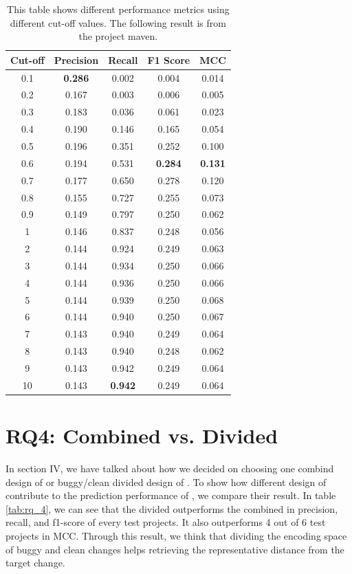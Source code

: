 \begin{table}[!ht]
\centering
\caption{This table shows different performance metrics using different cut-off values.
The following result is from the project maven. }
\begin{tabular}{|c|c|c|c|c|}
\hline
Cut-off & \multicolumn{1}{c|}{Precision} & \multicolumn{1}{c|}{Recall} & \multicolumn{1}{c|}{F1 Score} & \multicolumn{1}{c|}{MCC} \\ \hline
0.1 & \textbf{0.286} & 0.002 & 0.004 & 0.014 \\ \hline
0.2 & 0.167 & 0.003 & 0.006 & 0.005 \\ \hline
0.3 & 0.183 & 0.036 & 0.061 & 0.023 \\ \hline
0.4 & 0.190 & 0.146 & 0.165 & 0.054 \\ \hline
0.5 & 0.196 & 0.351 & 0.252 & 0.100 \\ \hline
0.6 & 0.194 & 0.531 & \textbf{0.284} & \textbf{0.131} \\ \hline
0.7 & 0.177 & 0.650 & 0.278 & 0.120 \\ \hline
0.8 & 0.155 & 0.727 & 0.255 & 0.073 \\ \hline
0.9 & 0.149 & 0.797 & 0.250 & 0.062 \\ \hline
1 & 0.146 & 0.837 & 0.248 & 0.056 \\ \hline
2 & 0.144 & 0.924 & 0.249 & 0.063 \\ \hline
3 & 0.144 & 0.934 & 0.250 & 0.066 \\ \hline
4 & 0.144 & 0.936 & 0.250 & 0.066 \\ \hline
5 & 0.144 & 0.939 & 0.250 & 0.068 \\ \hline
6 & 0.144 & 0.940 & 0.250 & 0.067 \\ \hline
7 & 0.143 & 0.940 & 0.249 & 0.064 \\ \hline
8 & 0.143 & 0.940 & 0.248 & 0.062 \\ \hline
9 & 0.143 & 0.942 & 0.249 & 0.064 \\ \hline
10 & 0.143 & \textbf{0.942} & 0.249 & 0.064 \\ \hline
\end{tabular}%
\label{tab:rq_3}
\end{table}


\section{RQ4: Combined {\simfin} vs. Divided {\simfin}}
In section IV, we have talked about how we decided on choosing one combind design of {\simfin} or buggy/clean divided design of {\simfin}.
To show how different design of {\simfin} contribute to the prediction performance of {\simfinmo}, we compare their result.
In table \ref{tab:rq_4}, we can see that the divided {\simfin} outperforms the combined {\simfin} in precision, recall, and f1-score of every test projects.
It also outperforms 4 out of 6 test projects in MCC.
Through this result, we think that dividing the encoding space of buggy and clean changes helps retrieving the representative distance from the target change.


